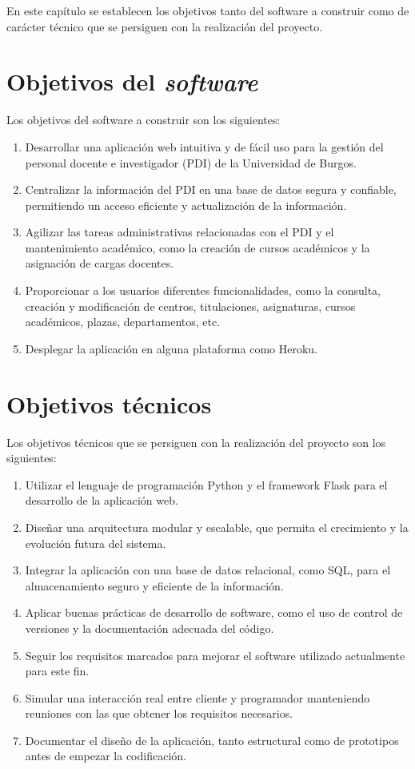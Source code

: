 
En este capítulo se establecen los objetivos tanto del software a construir como de carácter técnico que se persiguen con la realización del proyecto.

\section{Objetivos del \textit{software}}

Los objetivos del software a construir son los siguientes:

\begin{enumerate}
  \item Desarrollar una aplicación web intuitiva y de fácil uso para la gestión del personal docente e investigador (PDI) de la Universidad de Burgos.
  \item Centralizar la información del PDI en una base de datos segura y confiable, permitiendo un acceso eficiente y actualización de la información.
  \item Agilizar las tareas administrativas relacionadas con el PDI y el mantenimiento académico, como la creación de cursos académicos y la asignación de cargas docentes.
  \item Proporcionar a los usuarios diferentes funcionalidades, como la consulta, creación y modificación de centros, titulaciones, asignaturas, cursos académicos, plazas, departamentos, etc.
  \item Desplegar la aplicación en alguna plataforma como Heroku.
\end{enumerate}

\section{Objetivos técnicos}

Los objetivos técnicos que se persiguen con la realización del proyecto son los siguientes:

\begin{enumerate}
  \item Utilizar el lenguaje de programación Python y el framework Flask para el desarrollo de la aplicación web.
  \item Diseñar una arquitectura modular y escalable, que permita el crecimiento y la evolución futura del sistema.
  \item Integrar la aplicación con una base de datos relacional, como SQL, para el almacenamiento seguro y eficiente de la información.
  \item Aplicar buenas prácticas de desarrollo de software, como el uso de control de versiones y la documentación adecuada del código.
  \item Seguir los requisitos marcados para mejorar el software utilizado actualmente para este fin.
  \item Simular una interacción real entre cliente y programador manteniendo reuniones con las que obtener los requisitos necesarios.
  \item Documentar el diseño de la aplicación, tanto estructural como de prototipos antes de empezar la codificación.
\end{enumerate}